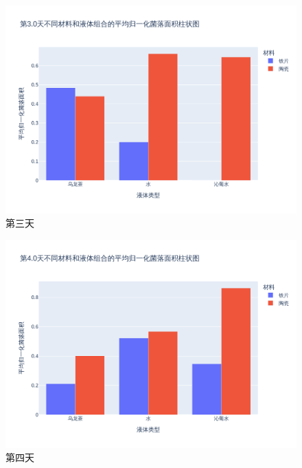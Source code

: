 \documentclass[12pt,a4paper]{ctexart}
\begin{document}
\begin{figure}[H]  %
    \centering  %
    \includegraphics[width=\textwidth]{./plot/SingleDay/bar_normalized_day3.0.png}  %
    \caption{第三天}  %
    \label{fig:SingleDayBar3}  %
\end{figure}

\begin{figure}[H]  %
    \centering  %
    \includegraphics[width=\textwidth]{./plot/SingleDay/bar_normalized_day4.0.png}  %
    \caption{第四天}  %
    \label{fig:SingleDayBar4}  %
\end{figure}
\end{document}
